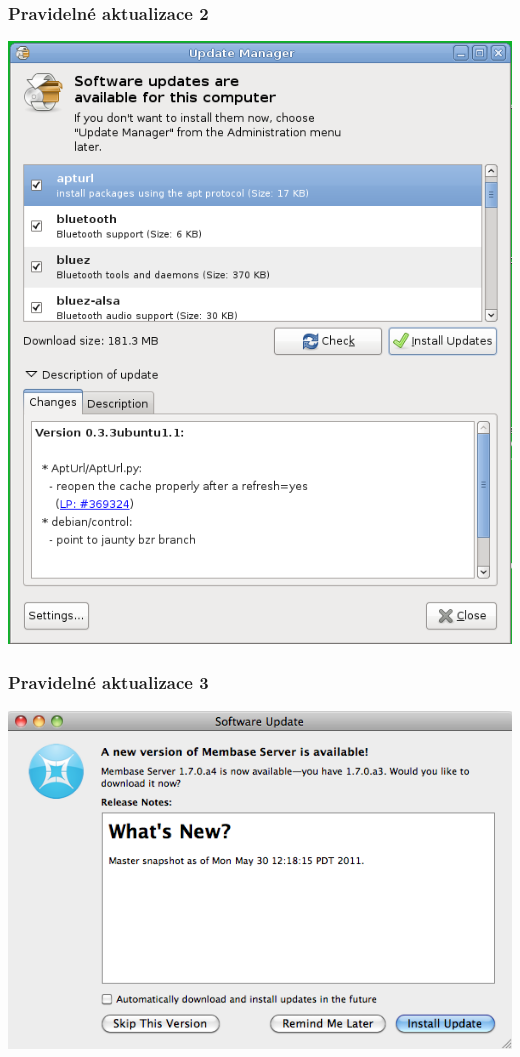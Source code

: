 \documentclass[xetex]{beamer}
\begin{document}
\begin{frame}
	\frametitle{Pravidelné aktualizace 2} 
	\includegraphics[scale=0.3]{pic/gnome-update.png}
\end{frame}

\begin{frame}
	\frametitle{Pravidelné aktualizace 3} 
	\includegraphics[scale=0.5]{pic/macosx-update.png}
\end{frame}
\end{document}
